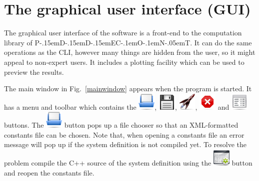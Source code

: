 \documentclass[10pt,a4paper]{ddedoc}
\def\pdde{{P\kern-.15emD\kern-.15emD\kern-.15emE\raisebox{.25ex}{-}C\kern-.1emO\kern-.1emN\kern-.05emT}}
\newcommand{\iconRun}{\protect\includegraphics[height=0.8\baselineskip]{fig/cr32-action-launch}}
\newcommand{\iconStop}{\protect\includegraphics[height=0.8\baselineskip]{fig/cr32-action-stop}}
\newcommand{\iconBuild}{\protect\includegraphics[height=0.8\baselineskip]{fig/cr32-action-build}}
\newcommand{\iconText}{\protect\includegraphics[height=0.8\baselineskip]{fig/cr32-action-view_text}}
\newcommand{\iconOpen}{\protect\includegraphics[height=0.8\baselineskip]{fig/cr32-action-fileopen}}
\newcommand{\iconSave}{\protect\includegraphics[height=0.8\baselineskip]{fig/cr32-action-filesave}}
\begin{document}
\section{The graphical user interface (GUI)}

The graphical user interface of the software is a front-end to the computation
library of \pdde{}. It can do the same operations as the CLI, however many things are
hidden from the user, so it might appeal to non-expert users. It includes a plotting
facility which can be used to preview the results.

The main window in Fig.\ \ref{mainwindow} appears
when the program  is started.
It has a menu and toolbar which 
contains the  \iconOpen{},  \iconSave{},
 \iconRun{},  \iconStop{} and
 \iconText{} buttons. The  \iconOpen{} button pops up a
file chooser so that an XML-formatted constants file can be chosen. Note that, when opening a constants file an error message will pop up if
the system definition is not compiled yet. To resolve the problem compile the C++ source
of the system definition using the  \iconBuild{} button and reopen the constants file.
\end{document}
